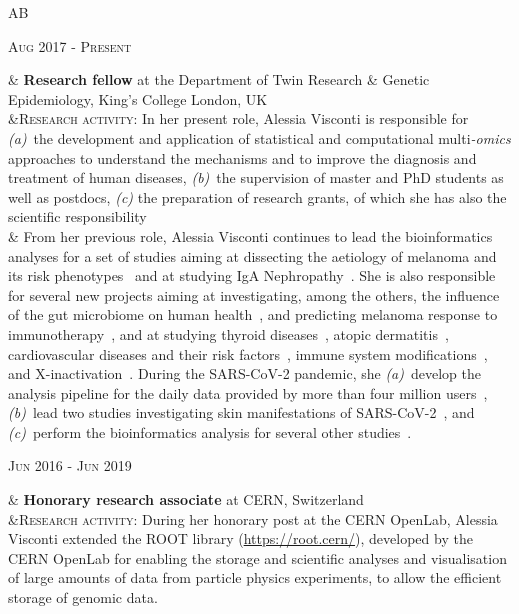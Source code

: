 \documentclass[a4paper,10pt]{article}
\newenvironment{doubletablelist}
{
	\vspace{-0.2cm}
	\begin{longtable}[!h]{AB}}{\end{longtable}
}
\newcommand{\dtlist}[2]{
\hspace{-3cm}
\noindent
	\begin{minipage}{0.22\textwidth}
	\begin{flushright}
	\textsc{#1}
	\end{flushright}
	\end{minipage}
	& #2\\[0.2cm]
}
\begin{document}
\begin{doubletablelist}
    
	\dtlist{Aug 2017 - Present}{\textbf{Research fellow} at the Department of Twin Research \& Genetic Epidemiology, King's College London, UK \\	
	 &\textsc{Research activity}: In her present role, Alessia Visconti is responsible for \emph{(a)}~the development and application of statistical and computational multi\emph{-omics} approaches to understand the mechanisms and to improve the diagnosis and treatment of human diseases, \emph{(b)}~the supervision of master and PhD students as well as postdocs, \emph{(c)} the preparation of research grants, of which she has also the scientific responsibility\\
	  & From her previous role, Alessia Visconti continues to lead the bioinformatics analyses for a set of studies aiming at dissecting the aetiology of melanoma and its risk phenotypes~\cite{Vis19a,Vis20,Lan20,San20} and at studying IgA Nephropathy~\cite{Dot21}. She is also responsible for several new projects aiming at investigating, among the others, the influence of the gut microbiome on human health~\cite{Vis19,Bar20,LeR22,Zha22,Val23,Lou23}, and predicting melanoma response to immunotherapy~\cite{Ros22,Vis23}, and at studying thyroid diseases~\cite{Mar20}, atopic dermatitis~\cite{Gro21,Bud22}, cardiovascular diseases and their risk factors~\cite{Ros21}, immune system modifications~\cite{Pia21}, and X-inactivation~\cite{Zit23}. During the SARS-CoV-2 pandemic, she \emph{(a)}~develop the analysis pipeline for the daily data provided by more than four million users~\cite{Mur21}, \emph{(b)}~lead two studies investigating skin manifestations of SARS-CoV-2~\cite{Vis21, Vis22}, and \emph{(c)}~perform the bioinformatics analysis for several other studies~\cite{Men20,Lee20,Zaz20,Hop21,Wil21,Sud21}. %
	}
	
	
    \dtlist{Jun 2016 - Jun 2019}{\textbf{Honorary research associate} at CERN, Switzerland \\
	 &\textsc{Research activity}: During her honorary post at the CERN OpenLab, Alessia Visconti extended the ROOT library (\url{https://root.cern/}), developed by the CERN OpenLab for enabling the storage and scientific analyses and visualisation of large amounts of data from particle physics experiments, to allow the efficient storage of genomic data. %
	}
    

\end{doubletablelist}
\end{document}
